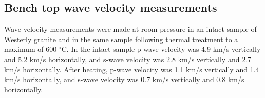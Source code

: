 \subsection{Bench top wave velocity measurements}

Wave velocity measurements were made at room  pressure in an intact sample of Westerly granite and in the same sample following thermal treatment to a maximum of 600 $^\circ$C. In the intact sample p-wave velocity was 4.9 km/s vertically and 5.2 km/s horizontally, and s-wave velocity was 2.8 km/s vertically and 2.7 km/s horizontally. After heating, p-wave velocity was 1.1 km/s vertically and 1.4 km/s horizontally, and s-wave velocity was 0.7 km/s vertically and 0.8 km/s horizontally.
